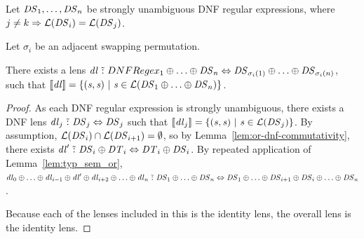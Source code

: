 \documentclass[acmsmall]{acmart}
\begin{document}
\begin{lemma}
  \label{lem:adj-swap-or}
  Let $\mathit{DS}_1,\ldots,\mathit{DS}_n$ be strongly unambiguous DNF regular
  expressions, where $j \neq k \Rightarrow
  \mathcal{L}(\mathit{DS}_i) = \mathcal{L}(\mathit{DS}_j)$.

  Let $\sigma_i$ be an adjacent swapping permutation.

  There exists a lens $\mathit{dl} \,\,\tilde{:}\,\, DNFRegex_1 \oplus \ldots
  \oplus \mathit{DS}_n \Leftrightarrow \mathit{DS}_{\sigma_i(1)} \oplus \ldots
  \oplus \mathit{DS}_{\sigma_i(n)}$, such that $[ \! [\mathit{dl}] \! ] =
  \{(\mathit{s},\mathit{s}) ~|~ \mathit{s} \in \mathcal{L}(\mathit{DS}_1 \oplus
      \ldots \oplus \mathit{DS}_n)\}$.
\end{lemma}
\begin{proof}
  As each DNF regular expression is strongly unambiguous, there exists a DNF
  lens $\mathit{dl}_j \,\,\tilde{:}\,\, \mathit{DS}_j \Leftrightarrow \mathit{DS}_j$
  such that $[ \! [\mathit{dl}_j] \! ] = \{(\mathit{s},\mathit{s}) ~|~
    \mathit{s} \in \mathcal{L}(\mathit{DS}_j)\}$.
  By assumption, $\mathcal{L}(\mathit{DS}_i) \cap \mathcal{L}(\mathit{DS}_{i+1}) = \emptyset$, so by
  Lemma~\ref{lem:or-dnf-commutativity},
  there exists $\mathit{dl}' \,\,\tilde{:}\,\, \mathit{DS}_i \oplus \mathit{DT}_i
  \Leftrightarrow \mathit{DT}_i \oplus \mathit{DS}_i$.  By repeated application of
  Lemma~\ref{lem:typ_sem_or},
  $\mathit{dl}_0 \oplus \ldots \oplus \mathit{dl}_{i-1} \oplus \mathit{dl}' \oplus
  \mathit{dl}_{i+2} \oplus \ldots \oplus \mathit{dl}_n \,\,\tilde{:}\,\,
  \mathit{DS}_1 \oplus \ldots \oplus \mathit{DS}_n
  \Leftrightarrow
  \mathit{DS}_1 \oplus \ldots \oplus \mathit{DS}_{i+1} \oplus \mathit{DS}_i \oplus
  \ldots \oplus \mathit{DS}_n$.

  Because each of the lenses included in this is the identity lens, the overall
  lens is the identity lens.
\end{proof}
\end{document}

